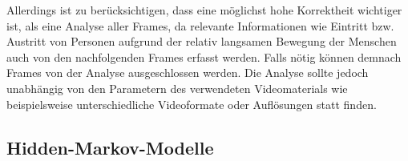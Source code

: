 Allerdings ist zu berücksichtigen, dass eine möglichst hohe Korrektheit wichtiger ist, als eine Analyse aller Frames, da relevante Informationen wie Eintritt bzw. Austritt von Personen aufgrund der relativ langsamen Bewegung der Menschen auch von den nachfolgenden Frames erfasst werden. Falls nötig können demnach Frames von der Analyse ausgeschlossen werden.
Die Analyse sollte jedoch unabhängig von den Parametern des verwendeten Videomaterials wie beispielsweise unterschiedliche Videoformate oder Auflösungen statt finden.


\subsection{Hidden-Markov-Modelle}
\label{sec:hiddenmarkovmodel}

